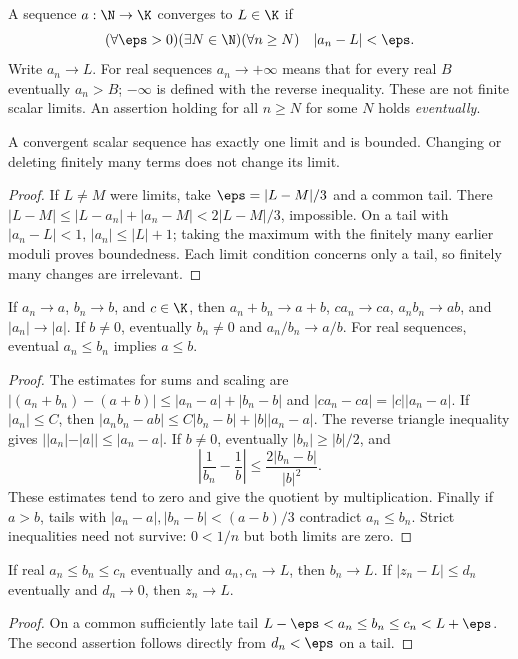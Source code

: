 \begin{definition}
A sequence $a:\N\to\K$ converges to $L\in\K$ if
\[ (\forall\eps>0)(\exists N\in\N)(\forall n\ge N)\quad |a_n-L|<\eps. \]
Write $a_n\to L$. For real sequences $a_n\to+\infty$ means that for every real $B$ eventually $a_n>B$; $-\infty$ is defined with the reverse inequality. These are not finite scalar limits. An assertion holding for all $n\ge N$ for some $N$ holds \emph{eventually}.
\end{definition}

\begin{proposition}
A convergent scalar sequence has exactly one limit and is bounded. Changing or deleting finitely many terms does not change its limit.
\end{proposition}
\begin{proof}
If $L\ne M$ were limits, take $\eps=|L-M|/3$ and a common tail. There $|L-M|\le|L-a_n|+|a_n-M|<2|L-M|/3$, impossible. On a tail with $|a_n-L|<1$, $|a_n|\le |L|+1$; taking the maximum with the finitely many earlier moduli proves boundedness. Each limit condition concerns only a tail, so finitely many changes are irrelevant.
\end{proof}

\begin{theorem}
If $a_n\to a$, $b_n\to b$, and $c\in\K$, then $a_n+b_n\to a+b$, $ca_n\to ca$, $a_nb_n\to ab$, and $|a_n|\to|a|$. If $b\ne0$, eventually $b_n\ne0$ and $a_n/b_n\to a/b$. For real sequences, eventual $a_n\le b_n$ implies $a\le b$.
\end{theorem}
\begin{proof}
The estimates for sums and scaling are $|(a_n+b_n)-(a+b)|\le|a_n-a|+|b_n-b|$ and $|ca_n-ca|=|c||a_n-a|$. If $|a_n|\le C$, then $|a_nb_n-ab|\le C|b_n-b|+|b||a_n-a|$. The reverse triangle inequality gives $||a_n|-|a||\le|a_n-a|$. If $b\ne0$, eventually $|b_n|\ge |b|/2$, and
\[ \left|\frac1{b_n}-\frac1b\right|\le\frac{2|b_n-b|}{|b|^2}. \]
These estimates tend to zero and give the quotient by multiplication. Finally if $a>b$, tails with $|a_n-a|,|b_n-b|<(a-b)/3$ contradict $a_n\le b_n$. Strict inequalities need not survive: $0<1/n$ but both limits are zero.
\end{proof}

\begin{theorem}
If real $a_n\le b_n\le c_n$ eventually and $a_n,c_n\to L$, then $b_n\to L$. If $|z_n-L|\le d_n$ eventually and $d_n\to0$, then $z_n\to L$.
\end{theorem}
\begin{proof}
On a common sufficiently late tail $L-\eps<a_n\le b_n\le c_n<L+\eps$. The second assertion follows directly from $d_n<\eps$ on a tail.
\end{proof}

